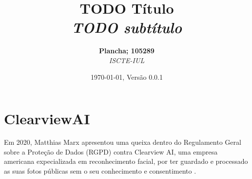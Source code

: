 \documentclass[12pt]{../diazessay}
\title{\textbf{TODO Título} \\ {\Large\itshape TODO subtítulo}}
\author{\textbf{Plancha; 105289} \\ \textit{ISCTE-IUL}}
\date{\today , Versão 0.0.1}
\begin{document}
\maketitle

\section*{ClearviewAI}
Em 2020, Matthias Marx apresentou uma queixa dentro do Regulamento Geral sobre a Proteção de Dados (RGPD) contra Clearview AI, uma empresa americana expecializada em reconhecimento facial, por ter guardado e processado as suas fotos públicas sem o seu conhecimento e consentimento \parencite{wired}.


\printbibliography[title=Referências]
\end{document}
